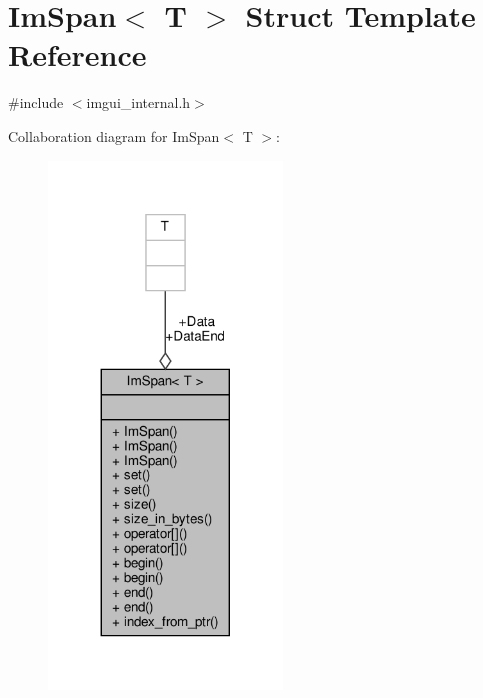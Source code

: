 \hypertarget{structImSpan}{}\section{Im\+Span$<$ T $>$ Struct Template Reference}
\label{structImSpan}


{\ttfamily \#include $<$imgui\+\_\+internal.\+h$>$}



Collaboration diagram for Im\+Span$<$ T $>$\+:
\nopagebreak
\begin{figure}[H]
\begin{center}
\leavevmode
\includegraphics[width=176pt]{structImSpan__coll__graph}
\end{center}
\end{figure}
